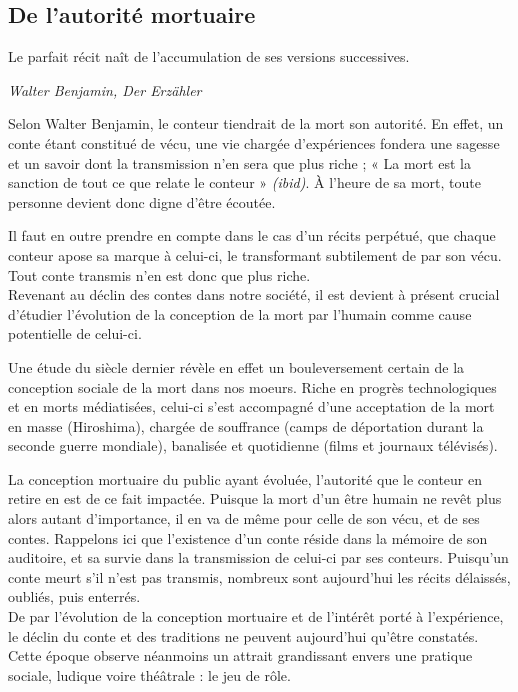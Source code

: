 \subsection{De l'autorité mortuaire}

\begin{shadequote}
Le parfait récit naît de l'accumulation de ses versions successives. \par\emph{Walter Benjamin, Der Erzähler}
\end{shadequote}

Selon Walter Benjamin, le conteur tiendrait de la mort son autorité. En effet, un conte étant constitué de vécu, une vie chargée d'expériences fondera une sagesse et un savoir dont la transmission n'en sera que plus riche ; « La mort est la sanction de tout ce que relate le conteur » \textit{(ibid)}. À l'heure de sa mort, toute personne devient donc digne d'être écoutée.

Il faut en outre prendre en compte dans le cas d'un récits perpétué, que chaque conteur apose sa marque à celui-ci, le transformant subtilement de par son vécu. Tout conte transmis n'en est donc que plus riche.\\


Revenant au déclin des contes dans notre société, il est devient à présent crucial d'étudier l'évolution de la conception de la mort par l'humain comme cause potentielle de celui-ci.

Une étude du siècle dernier révèle en effet un bouleversement certain de la conception sociale de la mort dans nos moeurs. Riche en progrès technologiques et en morts médiatisées, celui-ci s'est accompagné d'une acceptation de la mort en masse (Hiroshima), chargée de souffrance (camps de déportation durant la seconde guerre mondiale), banalisée et quotidienne (films et journaux télévisés).

La conception mortuaire du public ayant évoluée, l'autorité que le conteur en retire en est de ce fait impactée. Puisque la mort d'un être humain ne revêt plus alors autant d'importance, il en va de même pour celle de son vécu, et de ses contes. Rappelons ici que l'existence d'un conte réside dans la mémoire de son auditoire, et sa survie dans la transmission de celui-ci par ses conteurs. Puisqu'un conte meurt s'il n'est pas transmis, nombreux sont aujourd'hui les récits délaissés, oubliés, puis enterrés.\\

De par l'évolution de la conception mortuaire et de l'intérêt porté à l'expérience, le déclin du conte et des traditions ne peuvent aujourd'hui qu'être constatés. Cette époque observe néanmoins un attrait grandissant envers une pratique sociale, ludique voire théâtrale : le jeu de rôle.

\clearpage
